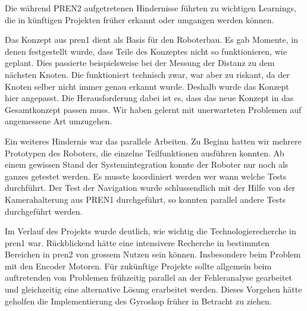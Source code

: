 Die während PREN2 aufgetretenen Hindernisse führten zu wichtigen Learnings, die in künftigen Projekten früher erkannt oder umgangen werden können.

Das Konzept aus \acrshort{pren1} dient als Basis für den Roboterbau. Es gab Momente, in denen festgestellt wurde, dass Teile des Konzeptes nicht so funktionieren, wie geplant. Dies passierte beispielsweise bei der Messung der Distanz zu dem nächsten Knoten. Die funktioniert technisch zwar, war aber zu riskant, da der Knoten selber nicht immer genau erkannt wurde. Deshalb wurde das Konzept hier angepasst. Die Herausforderung dabei ist es, dass das neue Konzept in das Gesamtkonzept passen muss. Wir haben gelernt mit unerwarteten Problemen auf angemessene Art umzugehen.

Ein weiteres Hindernis war das parallele Arbeiten. Zu Beginn hatten wir mehrere Prototypen des Roboters, die einzelne Teilfunktionen ausführen konnten. Ab einem gewissen Stand der Systemintegration konnte der Roboter nur noch als ganzes getestet werden. Es musste koordiniert werden wer wann welche Tests durchführt. Der Test der Navigation wurde schlussendlich mit der Hilfe von der Kamerahalterung aus PREN1 durchgeführt, so konnten parallel andere Tests durchgeführt werden.

Im Verlauf des Projekts wurde deutlich, wie wichtig die Technologierecherche in \acrshort{pren1} war. Rückblickend hätte eine intensivere Recherche in bestimmten Bereichen in \acrshort{pren2} von grossem Nutzen sein können. Insbesondere beim Problem mit den Encoder Motoren. Für zukünftige Projekte sollte allgemein beim auftretenden von Problemen frühzeitig parallel an der Fehleranalyse gearbeitet und gleichzeitig eine alternative Lösung erarbeitet werden. Dieses Vorgehen hätte geholfen die Implementierung des Gyroskop früher in Betracht zu ziehen.

